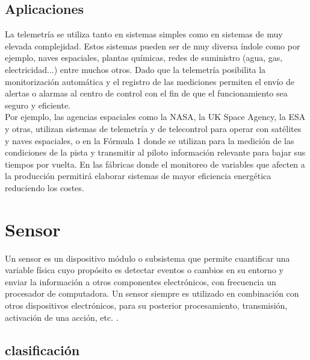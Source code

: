 \subsection{Aplicaciones}

La telemetría se utiliza tanto en sistemas simples como en sistemas de muy elevada complejidad. Estos sistemas pueden ser de muy diversa índole como por ejemplo, naves espaciales,
plantas químicas, redes de suministro (agua, gas, electricidad...) entre muchos otros. Dado que la telemetría posibilita la monitorización automática y el registro de las mediciones
permiten el envío de alertas o alarmas al centro de control con el fin de que el funcionamiento sea seguro y eficiente.\\

Por ejemplo, las agencias espaciales como la NASA, la UK Space Agency, la ESA y otras, utilizan sistemas de telemetría y de telecontrol para operar con satélites y naves espaciales,
o en la Fórmula 1 donde se utilizan para la medición de las condiciones de la pista y transmitir al piloto información relevante para bajar sus tiempos por vuelta. En las fábricas donde
el monitoreo de variables que afecten a la producción permitirá elaborar sistemas de mayor eficiencia energética reduciendo los costes.\\

\section{Sensor}
\label{sec:sensor-definicion}

Un sensor es un dispositivo módulo o subsistema que permite cuantificar una variable física cuyo propósito es detectar eventos o cambios en su entorno y
enviar la información a otros componentes electrónicos, con frecuencia un procesador de computadora. Un sensor siempre es utilizado en combinación con 
otros dispositivos electrónicos, para su posterior procesamiento, transmisión, activación de una acción, etc. \cite{book:sensoresyactuadores}. \\


\subsection{clasificación}


